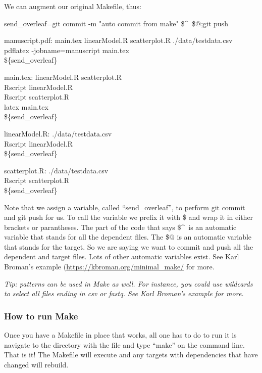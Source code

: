 \documentclass{article}
\begin{document}
We can augment our original Makefile, thus:

send\_overleaf=git commit -m "auto commit from make" \$\textasciicircum\ \$$@$;git push

manuscript.pdf: main.tex linearModel.R scatterplot.R ./data/testdata.csv\\
\tab pdflatex -jobname=manuscript main.tex\\
\tab \$\{send\_overleaf\}

main.tex: linearModel.R scatterplot.R\\
\tab Rscript linearModel.R\\
\tab Rscript scatterplot.R\\
\tab latex main.tex\\
\tab \$\{send\_overleaf\}

linearModel.R: ./data/testdata.csv\\
\tab Rscript linearModel.R\\
\tab \$\{send\_overleaf\}

scatterplot.R: ./data/testdata.csv\\
\tab Rscript scatterplot.R\\
\tab \$\{send\_overleaf\}

Note that we assign a variable, called ``send\_overleaf'', to perform git commit and git push for us. To call the variable we prefix it with \$ and wrap it in either brackets or parantheses. The part of the code that says \$\textasciicircum\ is an automatic variable that stands for all the dependent files. The \$$@$ is an automatic variable that stands for the target. So we are saying we want to commit and push all the dependent and target files. Lots of other automatic variables exist. See Karl Broman's example (\url{https://kbroman.org/minimal_make/} for more.

\emph{Tip: patterns can be used in {\sf Make} as well. For instance, you could use wildcards to select all files ending in csv or fastq. See Karl Broman's example for more.}

\subsubsection{How to run {\sf Make}}

Once you have a Makefile in place that works, all one has to do to run it is navigate to the directory with the file and type ``make'' on the command line. That is it! The Makefile will execute and any targets with dependencies that have changed will rebuild. 
\end{document}
